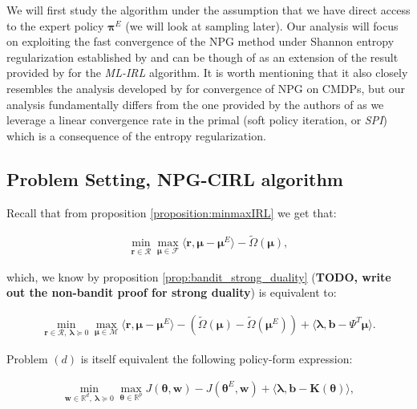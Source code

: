 We will first study the algorithm under the assumption that we have direct access to the expert policy $\bm{\pi}^E$ (we will look at sampling later). 
Our analysis will focus on exploiting the fast convergence of the NPG method under Shannon entropy regularization established by \cite{Cen2021} and can be though of as an extension of the result provided by \cite{Zeng2022} for the \textit{ML-IRL} algorithm. 
It is worth mentioning that it also closely resembles the analysis developed by \cite{Ding2020} for convergence of NPG on CMDPs, but our analysis fundamentally differs from the one provided by the authors of \cite{Ding2020} as we leverage a linear convergence rate in the primal (soft policy iteration, or \textit{SPI}) which is a consequence of the entropy regularization. 

\subsection{Problem Setting, NPG-CIRL algorithm}

Recall that from proposition \ref{proposition:minmaxIRL} we get that: 

\begin{align*}
    \min_{\bm{r}\in\mathcal{R}}\max_{\bm{\mu}\in\mathcal{F}} 
    \langle \bm{r}, \bm{\mu}-\bm{\mu}^E \rangle-\tilde{\Omega}(\bm{\mu}), \tag{p}
\end{align*}

which, we know by proposition \ref{prop:bandit_strong_duality} (\textbf{TODO, write out the non-bandit proof for strong duality}) is equivalent to:

\begin{align*}
    \min_{\bm{r}\in\mathcal{R}, ~ \bm{\lambda}\succcurlyeq 0}\max_{\bm{\mu}\in\mathcal{M}} 
    \langle \bm{r}, \bm{\mu}-\bm{\mu}^E \rangle-(\tilde{\Omega}(\bm{\mu})-\tilde{\Omega}(\bm{\mu}^E)) + \langle \bm{\lambda}, \bm{b}-\Psi^T \bm{\mu} \rangle. \tag{d}
\end{align*}

Problem $(d)$ is itself equivalent the following policy-form expression:

\begin{align*}
    \min_{\bm{w}\in\mathbb{R}^d, ~ \bm{\lambda}\succcurlyeq 0}\max_{\bm{\theta}\in\mathbb{R}^p} 
    J(\bm{\theta},\bm{w}) - J(\bm{\theta}^E,\bm{w}) + \langle \bm{\lambda},\bm{b}-\bm{K}(\bm{\theta}) \rangle, \tag{D}
\end{align*}

